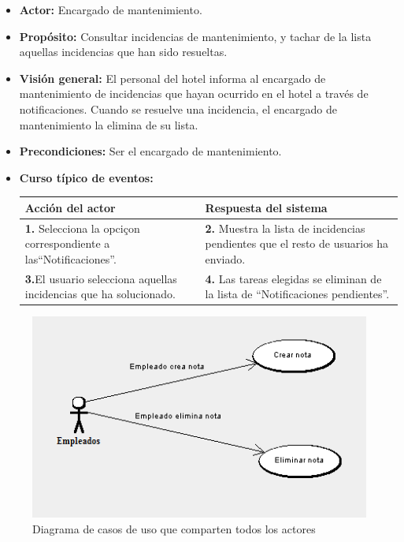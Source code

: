 \documentclass[spanish,a4paper,11pt, twoside]{report}	%
\begin{document}
			\begin{itemize}
			\item \textbf{Actor: }Encargado de mantenimiento.
			\item \textbf{Propósito: }Consultar incidencias de mantenimiento, y tachar de la
				lista aquellas incidencias que han sido resueltas.
			\item \textbf{Visión general: }El personal del hotel informa al encargado de
				mantenimiento de incidencias que hayan ocurrido en el hotel a través de
				notificaciones. Cuando se resuelve una incidencia, el encargado de mantenimiento
				la elimina de su lista.
			\item \textbf{Precondiciones:} Ser el encargado de mantenimiento.
			\item \textbf{Curso típico de eventos:} \\ 
			\begin{tabular}{|p{6cm}||p{6cm}|}
				\hline
				\textbf{Acción del actor} & \textbf{Respuesta del sistema} \\ \hline \hline
				\textbf{1.} Selecciona la opciçon correspondiente a las``Notificaciones''. & 
				\textbf{2.} Muestra la lista de incidencias pendientes  que el resto de usuarios ha enviado.\\ \hline 
				\textbf{3.}El usuario selecciona aquellas incidencias que ha solucionado. & 
				\textbf{4.} Las tareas elegidas se eliminan de la lista de ``Notificaciones pendientes''.\\ \hline
			\end{tabular}
		\end {itemize}
		

	\begin{figure}[!h]
		\centering
		\includegraphics[scale=0.5]{Notas.png}
		\caption{Diagrama de casos de uso que comparten todos los actores}
	\end{figure}
\end{document}
